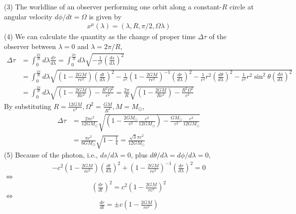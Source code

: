 \documentclass[12pt]{article}
\begin{document}
(3)
The worldline of an observer performing one orbit along a constant-$R$ circle at angular velocity $d \phi/d t = \Omega$ is given by
\begin{align*}
x^{\mu}(\lambda) = \left(\lambda, R, \pi/2, \Omega \lambda\right)
\end{align*}
(4) We can calculate the quantity as the change of proper time $\Delta \tau$ of the observer between $\lambda = 0$ and $\lambda = 2 \pi/R$,
\begin{align*}
\Delta \tau &= \int^{\frac{2 \pi}{R}}_{0} d\lambda \frac{d \tau}{d\lambda} = \int^{\frac{2 \pi}{R}}_{0} d\lambda \sqrt{-\frac{1}{c^2} \left(\frac{d s}{d\lambda}\right)^2}\\[1em]
&= \int^{\frac{2 \pi}{R}}_{0} d\lambda \sqrt{\left(1 - \frac{2 G M}{r c^2} \right) \left(\frac{dt}{d \lambda}\right)^2 -\frac{1}{c^2} \left(1 - \frac{2 G M}{r c^2} \right)^{-1} \left(\frac{dr}{d \lambda}\right)^2 -\frac{1}{c^2} r^2 \left(\frac{d\theta}{d \lambda}\right)^2 -\frac{1}{c^2} r^2 \sin^2{\theta} \left(\frac{d \phi}{d \lambda}\right)^2}\\[1em]
&= \int^{\frac{2 \pi}{R}}_{0} d\lambda \sqrt{\left(1 - \frac{2 G M}{R c^2} \right) -\frac{R^2 \Omega^2}{c^2}} = \frac{2 \pi}{R} \sqrt{\left(1 - \frac{2 G M}{R c^2} \right) -\frac{R^2 \Omega^2}{c^2}}
\end{align*}
By substituting $R = \frac{12 G M}{c^2}, \Omega^2 = \frac{G M}{R^3}, M = M_\odot$,
\begin{align*}
\Delta \tau &= \frac{2 \pi c^2}{12 G M_\odot} \sqrt{\left(1 - \frac{2 G M_\odot}{c^2} \frac{c^2}{12 G M_\odot}\right) -\frac{G M_\odot}{c^2} \frac{c^2}{12 G M_\odot}}\\[1em]
&= \frac{\pi c^2}{6 G M_\odot} \sqrt{1 - \frac{1 }{4}} = \frac{\sqrt{3} \pi c^2}{12 G M_\odot}
\end{align*}
(5) Because of the photon, i.e., $d s/ d \lambda = 0$, plus $d\theta/d \lambda = d \phi/d \lambda = 0$,
\begin{align*}
- c^2 \left(1 - \frac{2 G M}{r c^2}\right) \left(\frac{dt}{d \lambda}\right)^2 + \left(1 - \frac{2 G M}{r c^2}\right)^{-1} \left(\frac{dr}{d \lambda}\right)^2 = 0
\end{align*}
$\Leftrightarrow$
\begin{align*}
\left(\frac{dr}{d t}\right)^2 = c^2 \left(1 - \frac{2 G M}{r c^2}\right)^2
\end{align*}
$\Leftrightarrow$
\begin{align*}
\frac{dr}{d t} = \pm c \left(1 - \frac{2 G M}{r c^2}\right)
\end{align*}
\end{document}
